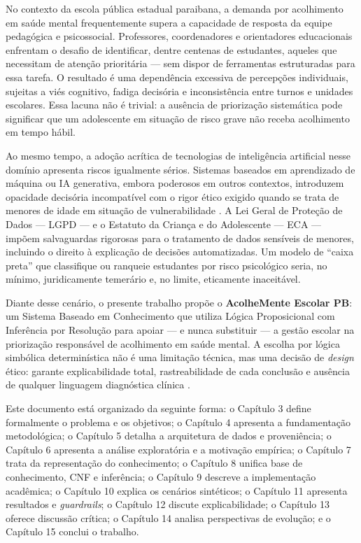 \documentclass[
    12pt,
    openright,
    oneside,
    a4paper,
    english,
    brazil
]{abntex2}
\begin{document}
No contexto da escola p\'ublica estadual paraibana, a demanda por acolhimento em sa\'ude mental frequentemente supera a capacidade de resposta da equipe pedag\'ogica e psicossocial. Professores, coordenadores e orientadores educacionais enfrentam o desafio de identificar, dentre centenas de estudantes, aqueles que necessitam de aten\c{c}\~ao priorit\'aria --- sem dispor de ferramentas estruturadas para essa tarefa. O resultado \'e uma depend\^encia excessiva de percep\c{c}\~oes individuais, sujeitas a vi\'es cognitivo, fadiga decis\'oria e inconsist\^encia entre turnos e unidades escolares. Essa lacuna n\~ao \'e trivial: a aus\^encia de prioriza\c{c}\~ao sistem\'atica pode significar que um adolescente em situa\c{c}\~ao de risco grave n\~ao receba acolhimento em tempo h\'abil.

Ao mesmo tempo, a ado\c{c}\~ao acr\'itica de tecnologias de intelig\^encia artificial nesse dom\'inio apresenta riscos igualmente s\'erios. Sistemas baseados em aprendizado de m\'aquina ou IA generativa, embora poderosos em outros contextos, introduzem opacidade decis\'oria incompat\'ivel com o rigor \'etico exigido quando se trata de menores de idade em situa\c{c}\~ao de vulnerabilidade \cite{jobin_ai_ethics_2019}. A Lei Geral de Prote\c{c}\~ao de Dados --- LGPD \cite{brasil_lgpd_2018} --- e o Estatuto da Crian\c{c}a e do Adolescente --- ECA \cite{brasil_eca_1990} --- imp\~oem salvaguardas rigorosas para o tratamento de dados sens\'iveis de menores, incluindo o direito \`a explica\c{c}\~ao de decis\~oes automatizadas. Um modelo de ``caixa preta'' que classifique ou ranqueie estudantes por risco psicol\'ogico seria, no m\'inimo, juridicamente temer\'ario e, no limite, eticamente inaceit\'avel.

Diante desse cen\'ario, o presente trabalho prop\~oe o \textbf{AcolheMente Escolar PB}: um Sistema Baseado em Conhecimento que utiliza L\'ogica Proposicional com Infer\^encia por Resolu\c{c}\~ao para apoiar --- e nunca substituir --- a gest\~ao escolar na prioriza\c{c}\~ao respons\'avel de acolhimento em sa\'ude mental. A escolha por l\'ogica simb\'olica determin\'istica n\~ao \'e uma limita\c{c}\~ao t\'ecnica, mas uma decis\~ao de \textit{design} \'etico: garante explicabilidade total, rastreabilidade de cada conclus\~ao e aus\^encia de qualquer linguagem diagn\'ostica cl\'inica \cite{russell_norvig_2022}.

Este documento est\'a organizado da seguinte forma: o Cap\'itulo 3 define formalmente o problema e os objetivos; o Cap\'itulo 4 apresenta a fundamenta\c{c}\~ao metodol\'ogica; o Cap\'itulo 5 detalha a arquitetura de dados e proveni\^encia; o Cap\'itulo 6 apresenta a an\'alise explorat\'oria e a motiva\c{c}\~ao emp\'irica; o Cap\'itulo 7 trata da representa\c{c}\~ao do conhecimento; o Cap\'itulo 8 unifica base de conhecimento, CNF e infer\^encia; o Cap\'itulo 9 descreve a implementa\c{c}\~ao acad\^emica; o Cap\'itulo 10 explica os cen\'arios sint\'eticos; o Cap\'itulo 11 apresenta resultados e \textit{guardrails}; o Cap\'itulo 12 discute explicabilidade; o Cap\'itulo 13 oferece discuss\~ao cr\'itica; o Cap\'itulo 14 analisa perspectivas de evolu\c{c}\~ao; e o Cap\'itulo 15 conclui o trabalho.
\end{document}

